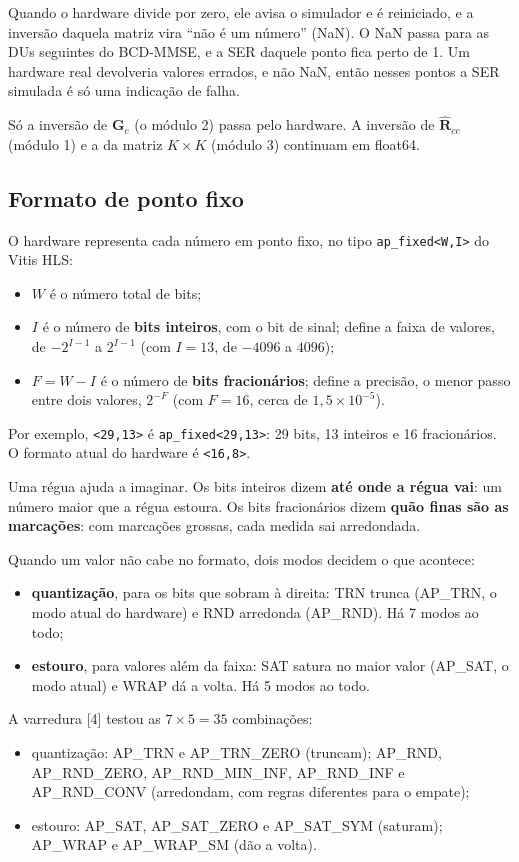 \documentclass[11pt]{article}
\begin{document}
Quando o hardware divide por zero, ele avisa o simulador e é reiniciado, e a inversão daquela
matriz vira ``não é um número'' (NaN). O NaN passa para as DUs seguintes do BCD-MMSE, e a SER
daquele ponto fica perto de 1. Um hardware real devolveria valores errados, e não NaN, então
nesses pontos a SER simulada é só uma indicação de falha.

Só a inversão de $\mathbf G_c$ (o módulo 2) passa pelo hardware. A inversão de
$\hat{\mathbf R}_{cc}$ (módulo 1) e a da matriz $K \times K$ (módulo 3) continuam em float64.

\subsection*{Formato de ponto fixo}

O hardware representa cada número em ponto fixo, no tipo \texttt{ap\_fixed<W,I>} do Vitis HLS:
\begin{itemize}
  \item $W$ é o número total de bits;
  \item $I$ é o número de \textbf{bits inteiros}, com o bit de sinal; define a faixa de valores,
        de $-2^{I-1}$ a $2^{I-1}$ (com $I = 13$, de $-4096$ a $4096$);
  \item $F = W - I$ é o número de \textbf{bits fracionários}; define a precisão, o menor passo
        entre dois valores, $2^{-F}$ (com $F = 16$, cerca de $1{,}5 \times 10^{-5}$).
\end{itemize}
Por exemplo, \texttt{<29,13>} é \texttt{ap\_fixed<29,13>}: 29 bits, 13 inteiros e 16 fracionários.
O formato atual do hardware é \texttt{<16,8>}.

Uma régua ajuda a imaginar. Os bits inteiros dizem \textbf{até onde a régua vai}: um número maior
que a régua estoura. Os bits fracionários dizem \textbf{quão finas são as marcações}: com
marcações grossas, cada medida sai arredondada.

Quando um valor não cabe no formato, dois modos decidem o que acontece:
\begin{itemize}
  \item \textbf{quantização}, para os bits que sobram à direita: TRN trunca (AP\_TRN, o modo atual
        do hardware) e RND arredonda (AP\_RND). Há 7 modos ao todo;
  \item \textbf{estouro}, para valores além da faixa: SAT satura no maior valor (AP\_SAT, o modo
        atual) e WRAP dá a volta. Há 5 modos ao todo.
\end{itemize}
A varredura [4] testou as $7 \times 5 = 35$ combinações:
\begin{itemize}
  \item quantização: AP\_TRN e AP\_TRN\_ZERO (truncam); AP\_RND, AP\_RND\_ZERO, AP\_RND\_MIN\_INF,
        AP\_RND\_INF e AP\_RND\_CONV (arredondam, com regras diferentes para o empate);
  \item estouro: AP\_SAT, AP\_SAT\_ZERO e AP\_SAT\_SYM (saturam); AP\_WRAP e AP\_WRAP\_SM (dão a
        volta).
\end{itemize}
\end{document}
